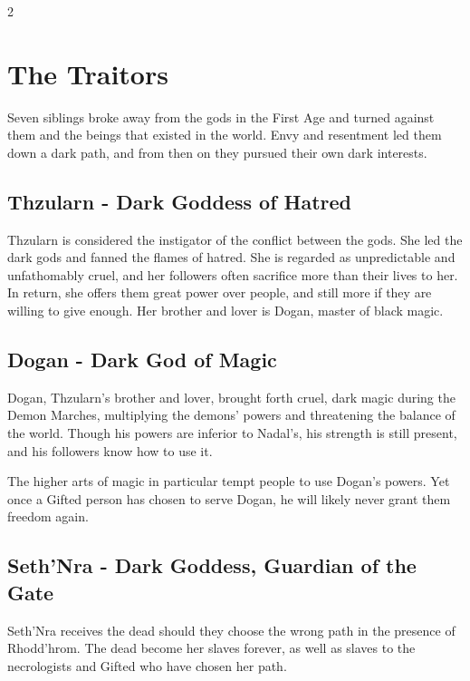 \begin{multicols}{2}
{\section{The Traitors}\label{sec:die-verrater}

Seven siblings broke away from the gods in the First Age and turned against them and the beings that existed in the world. Envy and resentment led them down a dark path, and from then on they pursued their own dark interests.

\subsection{Thzularn - Dark Goddess of Hatred}\label{subsec:thzularn-dunkle-gottin-des-hasses}

Thzularn is considered the instigator of the conflict between the gods. She led the dark gods and fanned the flames of hatred. She is regarded as unpredictable and unfathomably cruel, and her followers often sacrifice more than their lives to her. In return, she offers them great power over people, and still more if they are willing to give enough. Her brother and lover is Dogan, master of black magic.

\subsection{Dogan - Dark God of Magic}\label{subsec:dogan-dunkler-gott-der-magie}

Dogan, Thzularn's brother and lover, brought forth cruel, dark magic during the Demon Marches, multiplying the demons' powers and threatening the balance of the world. Though his powers are inferior to Nadal's, his strength is still present, and his followers know how to use it.

The higher arts of magic in particular tempt people to use Dogan's powers. Yet once a Gifted person has chosen to serve Dogan, he will likely never grant them freedom again.

\subsection{Seth'Nra - Dark Goddess, Guardian of the Gate}\label{subsec:sethnra-dunkle-gottin-wachterin-der-pforte}

Seth'Nra receives the dead should they choose the wrong path in the presence of Rhodd'hrom. The dead become her slaves forever, as well as slaves to the necrologists and Gifted who have chosen her path.

}
\end{multicols}
